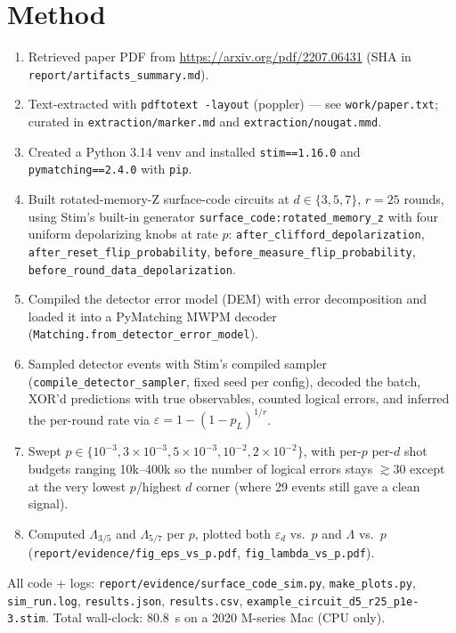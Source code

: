 \documentclass[11pt]{article}
\begin{document}
\section{Method}
\begin{enumerate}
  \item Retrieved paper PDF from \url{https://arxiv.org/pdf/2207.06431} (SHA in
        \texttt{report/artifacts\_summary.md}).
  \item Text-extracted with \texttt{pdftotext -layout} (poppler) --- see
        \texttt{work/paper.txt}; curated in \texttt{extraction/marker.md} and
        \texttt{extraction/nougat.mmd}.
  \item Created a Python 3.14 venv and installed \texttt{stim==1.16.0} and
        \texttt{pymatching==2.4.0} with \texttt{pip}.
  \item Built rotated-memory-Z surface-code circuits at $d\in\{3,5,7\}$,
        $r=25$ rounds, using Stim's built-in generator
        \texttt{surface\_code:rotated\_memory\_z} with four uniform
        depolarizing knobs at rate $p$: \texttt{after\_clifford\_depolarization},
        \texttt{after\_reset\_flip\_probability},
        \texttt{before\_measure\_flip\_probability},
        \texttt{before\_round\_data\_depolarization}.
  \item Compiled the detector error model (DEM) with error decomposition and
        loaded it into a PyMatching MWPM decoder
        (\texttt{Matching.from\_detector\_error\_model}).
  \item Sampled detector events with Stim's compiled sampler
        (\texttt{compile\_detector\_sampler}, fixed seed per config), decoded
        the batch, XOR'd predictions with true observables, counted logical
        errors, and inferred the per-round rate via
        $\varepsilon = 1 - (1-p_L)^{1/r}$.
  \item Swept $p\in\{10^{-3}, 3\times10^{-3}, 5\times10^{-3}, 10^{-2}, 2\times10^{-2}\}$,
        with per-$p$ per-$d$ shot budgets ranging 10k--400k so the number of
        logical errors stays $\gtrsim 30$ except at the very lowest $p$/highest $d$
        corner (where 29 events still gave a clean signal).
  \item Computed $\Lambda_{3/5}$ and $\Lambda_{5/7}$ per $p$, plotted both
        $\varepsilon_d$ vs.\ $p$ and $\Lambda$ vs.\ $p$
        (\texttt{report/evidence/fig\_eps\_vs\_p.pdf},
        \texttt{fig\_lambda\_vs\_p.pdf}).
\end{enumerate}

All code + logs: \texttt{report/evidence/surface\_code\_sim.py},
\texttt{make\_plots.py}, \texttt{sim\_run.log}, \texttt{results.json},
\texttt{results.csv}, \texttt{example\_circuit\_d5\_r25\_p1e-3.stim}.
Total wall-clock: 80.8~s on a 2020 M-series Mac (CPU only).
\end{document}
